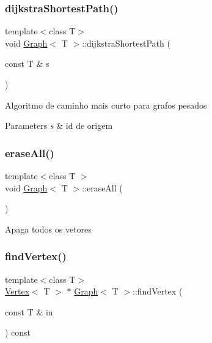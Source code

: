 \subsubsection{\texorpdfstring{dijkstra\+Shortest\+Path()}{dijkstraShortestPath()}}
{\footnotesize\ttfamily template$<$class T$>$ \\
void \mbox{\hyperlink{class_graph}{Graph}}$<$ T $>$\+::dijkstra\+Shortest\+Path (\begin{DoxyParamCaption}\item[{const T \&}]{s }\end{DoxyParamCaption})}

Algoritmo de caminho mais curto para grafos pesados 
\begin{DoxyParams}{Parameters}
{\em s} & id de origem \\
\hline
\end{DoxyParams}
\mbox{\label{class_graph_ac400bb3793e9851460e968ad72c0f230}} 
\subsubsection{\texorpdfstring{erase\+All()}{eraseAll()}}
{\footnotesize\ttfamily template$<$class T $>$ \\
void \mbox{\hyperlink{class_graph}{Graph}}$<$ T $>$\+::erase\+All (\begin{DoxyParamCaption}{ }\end{DoxyParamCaption})}

Apaga todos os vetores \mbox{\label{class_graph_a8b7b7465fbfd562e2a469f90a437ab75}} 
\subsubsection{\texorpdfstring{find\+Vertex()}{findVertex()}}
{\footnotesize\ttfamily template$<$class T$>$ \\
\mbox{\hyperlink{class_vertex}{Vertex}}$<$ T $>$ $\ast$ \mbox{\hyperlink{class_graph}{Graph}}$<$ T $>$\+::find\+Vertex (\begin{DoxyParamCaption}\item[{const T \&}]{in }\end{DoxyParamCaption}) const\hspace{0.3cm}{\ttfamily [private]}}

